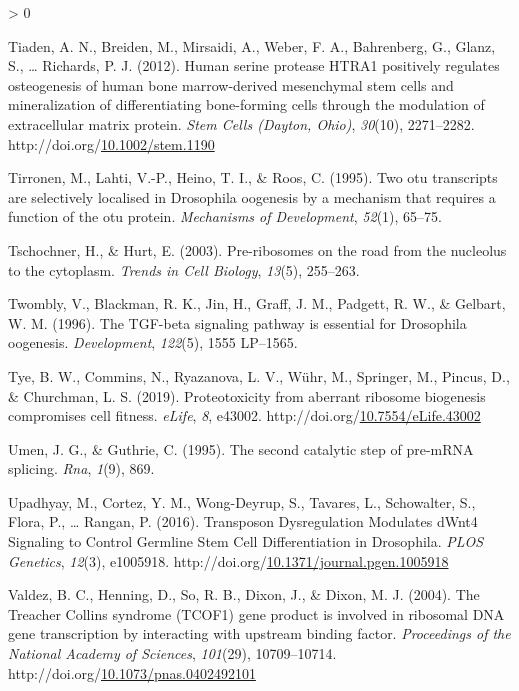 \documentclass[12pt,oneside]{reedthesis}
\newlength{\cslhangindent}
\newenvironment{CSLReferences}[2] %
 {%
  \setlength{\parindent}{0pt}
  \ifodd #1 \everypar{\setlength{\hangindent}{\cslhangindent}}\ignorespaces\fi
  \ifnum #2 > 0
  \setlength{\parskip}{#2\baselineskip}
  \fi
 }%
 {}
\begin{document}
\begin{CSLReferences}{1}{0}
\leavevmode\hypertarget{ref-tiadenHumanSerineProtease2012}{}%
Tiaden, A. N., Breiden, M., Mirsaidi, A., Weber, F. A., Bahrenberg, G., Glanz, S., \ldots{} Richards, P. J. (2012). Human serine protease {HTRA1} positively regulates osteogenesis of human bone marrow-derived mesenchymal stem cells and mineralization of differentiating bone-forming cells through the modulation of extracellular matrix protein. \emph{Stem Cells (Dayton, Ohio)}, \emph{30}(10), 2271--2282. http://doi.org/\href{https://doi.org/10.1002/stem.1190}{10.1002/stem.1190}

\leavevmode\hypertarget{ref-Tirronen1995}{}%
Tirronen, M., Lahti, V.-P., Heino, T. I., \& Roos, C. (1995). Two otu transcripts are selectively localised in {Drosophila} oogenesis by a mechanism that requires a function of the otu protein. \emph{Mechanisms of Development}, \emph{52}(1), 65--75.

\leavevmode\hypertarget{ref-Tschochner2003a}{}%
Tschochner, H., \& Hurt, E. (2003). Pre-ribosomes on the road from the nucleolus to the cytoplasm. \emph{Trends in Cell Biology}, \emph{13}(5), 255--263.

\leavevmode\hypertarget{ref-Twombly1996d}{}%
Twombly, V., Blackman, R. K., Jin, H., Graff, J. M., Padgett, R. W., \& Gelbart, W. M. (1996). The {TGF-beta} signaling pathway is essential for {Drosophila} oogenesis. \emph{Development}, \emph{122}(5), 1555 LP--1565.

\leavevmode\hypertarget{ref-tyeProteotoxicityAberrantRibosome2019}{}%
Tye, B. W., Commins, N., Ryazanova, L. V., Wühr, M., Springer, M., Pincus, D., \& Churchman, L. S. (2019). Proteotoxicity from aberrant ribosome biogenesis compromises cell fitness. \emph{eLife}, \emph{8}, e43002. http://doi.org/\href{https://doi.org/10.7554/eLife.43002}{10.7554/eLife.43002}

\leavevmode\hypertarget{ref-Umen1995}{}%
Umen, J. G., \& Guthrie, C. (1995). The second catalytic step of pre-{mRNA} splicing. \emph{Rna}, \emph{1}(9), 869.

\leavevmode\hypertarget{ref-upadhyayTransposonDysregulationModulates2016}{}%
Upadhyay, M., Cortez, Y. M., Wong-Deyrup, S., Tavares, L., Schowalter, S., Flora, P., \ldots{} Rangan, P. (2016). Transposon {Dysregulation Modulates dWnt4 Signaling} to {Control Germline Stem Cell Differentiation} in {Drosophila}. \emph{PLOS Genetics}, \emph{12}(3), e1005918. http://doi.org/\href{https://doi.org/10.1371/journal.pgen.1005918}{10.1371/journal.pgen.1005918}

\leavevmode\hypertarget{ref-valdezTreacherCollinsSyndrome2004}{}%
Valdez, B. C., Henning, D., So, R. B., Dixon, J., \& Dixon, M. J. (2004). The {Treacher Collins} syndrome ({TCOF1}) gene product is involved in ribosomal {DNA} gene transcription by interacting with upstream binding factor. \emph{Proceedings of the National Academy of Sciences}, \emph{101}(29), 10709--10714. http://doi.org/\href{https://doi.org/10.1073/pnas.0402492101}{10.1073/pnas.0402492101}


\end{CSLReferences}
\end{document}
